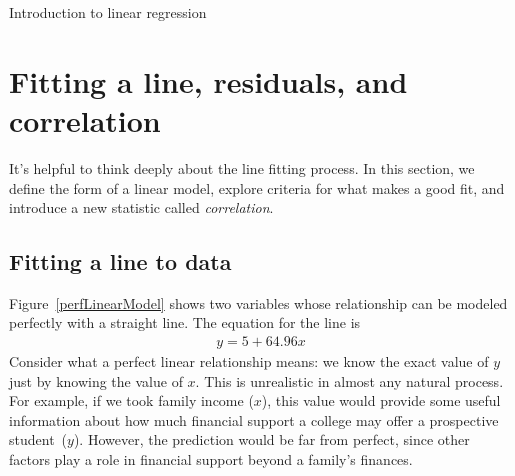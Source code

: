 \begin{chapterpage}{Introduction to linear regression}
  \label{linRegrForTwoVar}
  \label{ch_regr_simple_linear}
\end{chapterpage}
\renewcommand{\chapterfolder}{ch_regr_simple_linear}






\section{Fitting a line, residuals, and correlation}
\label{fitting_line_to_data_section}

It's helpful to think deeply about the line fitting process.
In this section, we define the form of a linear model,
explore criteria for what makes a good fit,
and introduce a new statistic called
\emph{correlation}.


\subsection{Fitting a line to data}

Figure~\ref{perfLinearModel} shows two variables whose
relationship can be modeled perfectly with a straight line.
The equation for the line is
\begin{eqnarray*}
y = 5 + 64.96 x
\end{eqnarray*}
Consider what a perfect linear relationship means:
we know the exact value of $y$ just by knowing
the value of $x$.
This is unrealistic in almost any natural process.
For example, if we took family income ($x$),
this value would provide some useful information about
how much financial support a college may offer a prospective
student~($y$).
However, the prediction would be far from perfect,
since other factors play a role in financial support
beyond a family's finances.

